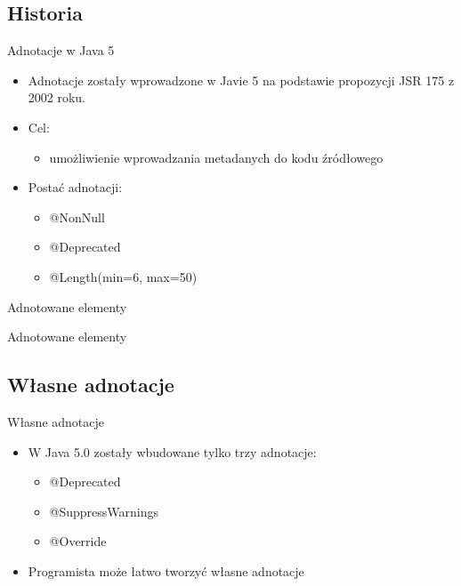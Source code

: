 \documentclass{beamer}
\begin{document}
\subsection{Historia}
\begin{frame}{Adnotacje w Java 5}
\begin{itemize}
\item<1-> Adnotacje zostały wprowadzone w Javie 5 na podstawie propozycji
  JSR 175 z 2002 roku.
\item<2-> Cel: 
\begin{itemize}
\item umożliwienie wprowadzania metadanych do kodu źródłowego
\end{itemize}
\item<3-> Postać adnotacji: 
\begin{itemize}
\item \color{red} @NonNull 
\item \color{red} @Deprecated
\item \color{red} @Length(min=6, max=50)
\end{itemize}
\end{itemize}
\end{frame}

\begin{frame}{Adnotowane elementy}
  
  \pause
  
\end{frame}

\begin{frame}{Adnotowane elementy}
  
  \pause
  
\end{frame}

\subsection{Własne adnotacje}

\begin{frame}{Własne adnotacje}
\begin{itemize}
\item W Java 5.0 zostały wbudowane tylko trzy adnotacje:
\begin{itemize}
\item \color{red} @Deprecated
\item \color{red} @SuppressWarnings
\item \color{red} @Override
\end{itemize}
\pause
\item Programista może łatwo tworzyć własne adnotacje
\end{itemize}
\end{frame}
\end{document}

